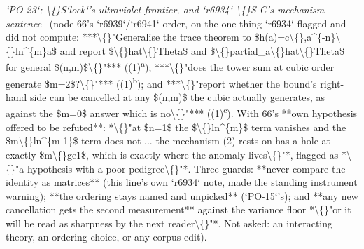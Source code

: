 \begin{description}
\textit{`PO-23`; \textbackslash\{\}S`lock`'s ultraviolet frontier, and `r6934` \textbackslash\{\}S C's mechanism sentence} \ (node 66's `r6939`/`r6941` order, on the one thing `r6934` flagged and did not compute: ***\textbackslash\{\}"Generalise the trace theorem to \$h(a)=c\textbackslash\{\},a\textasciicircum{}\{-n\}\textbackslash\{\}ln\textasciicircum{}\{m\}a\$ and report \$\textbackslash\{\}hat\textbackslash\{\}Theta\$ and \$\textbackslash\{\}partial\_a\textbackslash\{\}hat\textbackslash\{\}Theta\$ for general \$(n,m)\$\textbackslash\{\}"*** ((1)\textsuperscript{a}); ***\textbackslash\{\}"does the tower sum at cubic order generate \$m=2\$?\textbackslash\{\}"*** ((1)\textsuperscript{b}); and ***\textbackslash\{\}"report whether the bound's right-hand side can be cancelled at any \$(n,m)\$ the cubic actually generates, as against the \$m=0\$ answer which is no\textbackslash\{\}"*** ((1)\textsuperscript{c}).  With 66's **own hypothesis offered to be refuted**: *\textbackslash\{\}"at \$n=1\$ the \$\textbackslash\{\}ln\textasciicircum{}\{m\}\$ term vanishes and the \$m\textbackslash\{\}ln\textasciicircum{}\{m-1\}\$ term does not ... the mechanism (2) rests on has a hole at exactly \$m\textbackslash\{\}ge1\$, which is exactly where the anomaly lives\textbackslash\{\}"*, flagged as *\textbackslash\{\}"a hypothesis with a poor pedigree\textbackslash\{\}"*.  Three guards: **never compare the identity as matrices** (this line's own `r6934` note, made the standing instrument warning); **the ordering stays named and unpicked** (`PO-15`'s); and **any new cancellation gets the second measurement** against the variance floor *\textbackslash\{\}"or it will be read as sharpness by the next reader\textbackslash\{\}"*.  Not asked: an interacting theory, an ordering choice, or any corpus edit). 

\end{description}
